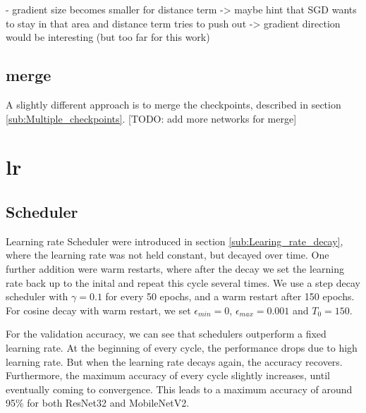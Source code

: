 - gradient size becomes smaller for distance term -> maybe hint that SGD wants
to stay in that area and distance term tries to push out -> gradient direction
would be interesting (but too far for this work)

\subsection{merge}
A slightly different approach is to merge the checkpoints, described in section
\ref{sub:Multiple_checkpoints}.
[TODO: add more networks for merge]










\section{lr}\label{res:Learning_rate}
\subsection{Scheduler}
Learning rate Scheduler were introduced in section \ref{sub:Learing_rate_decay},
where the learning rate was not held constant, but decayed over time. One
further addition were warm restarts, where after the decay we set the learning
rate back up to the inital and repeat this cycle several times. We use a step
decay scheduler with $\gamma = 0.1$ for every 50 epochs, and a warm restart
after 150 epochs. For cosine decay with warm restart, we set $\epsilon_{min}=0$,
$\epsilon_{max}=0.001$ and $T_0=150$.


For the validation accuracy, we can see that schedulers outperform a fixed
learning rate. At the beginning of every cycle, the performance drops due to
high learning rate. But when the learning rate decays again, the accuracy
recovers. Furthermore, the maximum accuracy of every cycle slightly increases,
until eventually coming to convergence. This leads to a maximum accuracy of
around 95\% for both ResNet32 and MobileNetV2.


